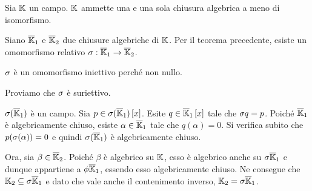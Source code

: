 \begin{Theorem}\label{thUnicitaChiusuraAlgebrica}
	Sia $\mathbb{K}$ un campo. $\mathbb{K}$ ammette una e una sola chiusura algebrica a meno di isomorfismo.
\end{Theorem}
\Proof Siano $\overline{\mathbb{K}}_1$ e $\overline{\mathbb{K}}_2$ due chiusure algebriche di $\mathbb{K}$. Per il teorema precedente, esiste un omomorfismo relativo $\sigma: \overline{\mathbb{K}}_1 \rightarrow \overline{\mathbb{K}}_2$.
\par $\sigma$ \`e un omomorfismo iniettivo perch\'e non nullo.
\par Proviamo che $\sigma$ \`e suriettivo.
\par $\sigma(\overline{\mathbb{K}}_1)$ \`e un campo. Sia $p \in \sigma(\overline{\mathbb{K}}_1) \left [ x \right ]$. Esite $q \in \overline{\mathbb{K}}_1 \left [ x \right ]$ tale che ${\sigma}{q} = p$. Poich\'e $\overline{\mathbb{K}}_1$ \`e algebricamente chiuso, esiste $\alpha \in \overline{\mathbb{K}}_1$ tale che $q(\alpha) = 0$. Si verifica subito che $p(\sigma(\alpha)) = 0$ e quindi $\sigma(\overline{\mathbb{K}}_1)$ \`e algebricamente chiuso.
\par Ora, sia $\beta \in \overline{\mathbb{K}}_2$. Poich\'e $\beta$ \`e algebrico su $\mathbb{K}$, esso \`e algebrico anche su $\sigma{\overline{\mathbb{K}}_1}$ e dunque appartiene a $\phi{\overline{\mathbb{K}}_1}$, essendo esso algebricamente chiuso. Ne consegue che $\mathbb{K}_2 \subseteq \sigma{\overline{\mathbb{K}}_1}$ e dato che vale anche il contenimento inverso, $\mathbb{K}_2 = \sigma{\overline{\mathbb{K}}_1}$. \EndProof

